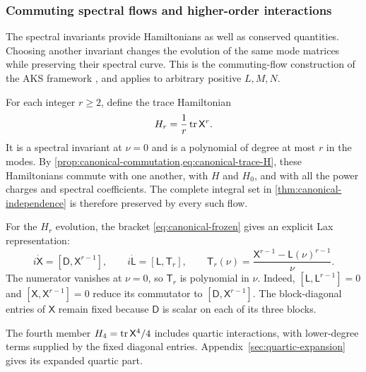 \begin{samepage}
\subsubsection{Commuting spectral flows and higher-order interactions}
\label{sec:spectral-flows}

The spectral invariants provide Hamiltonians as well as conserved
quantities. Choosing another invariant changes the evolution of the
same mode matrices while preserving their spectral curve. This is
the commuting-flow construction of the AKS framework
\cite{AdlerVanMoerbeke2018}, and applies to arbitrary positive
$L,M,N$.\par
\end{samepage}

For each integer $r\geq2$, define the trace Hamiltonian
\begin{equation}\label{eq:hierarchy-traces}
 H_r=\frac1r\operatorname{tr}\mathsf X^r.
\end{equation}
It is a spectral invariant at $\nu=0$ and is a polynomial of degree
at most $r$ in the modes. By
\cref{prop:canonical-commutation,eq:canonical-trace-H}, these
Hamiltonians commute with one another, with $H$ and $H_0$, and with
all the power charges and spectral coefficients. The complete
integral set in \cref{thm:canonical-independence} is therefore
preserved by every such flow.

For the $H_r$ evolution, the bracket
\cref{eq:canonical-frozen} gives an explicit Lax representation:
\begin{equation}\label{eq:hierarchy-lax}
 i\dot{\mathsf X}=[\mathsf D,\mathsf X^{r-1}],\qquad
 i\dot{\mathsf L}=[\mathsf L,\mathsf T_r],\qquad
 \mathsf T_r(\nu)=
       \frac{\mathsf X^{r-1}-\mathsf L(\nu)^{r-1}}{\nu}.
\end{equation}
The numerator vanishes at $\nu=0$, so $\mathsf T_r$ is polynomial
in $\nu$. Indeed, $[\mathsf L,\mathsf L^{r-1}]=0$ and
$[\mathsf X,\mathsf X^{r-1}]=0$ reduce its commutator to
$[\mathsf D,\mathsf X^{r-1}]$. The block-diagonal entries of
$\mathsf X$ remain fixed because $\mathsf D$ is scalar on each
of its three blocks.

The fourth member $H_4=\operatorname{tr}\mathsf X^4/4$ includes quartic
interactions, with lower-degree terms supplied by the fixed diagonal
entries. Appendix~\ref{sec:quartic-expansion} gives its expanded
quartic part.

